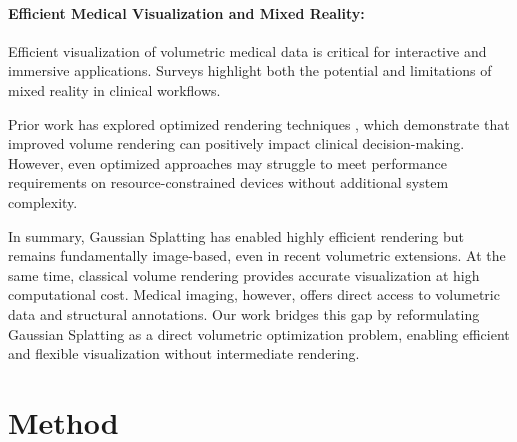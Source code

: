 \documentclass[runningheads]{llncs}
\begin{document}
\paragraph{Efficient Medical Visualization and Mixed Reality:}


Efficient visualization of volumetric medical data is critical for interactive and immersive applications. Surveys \cite{mrreview2024,mrreview2} highlight both the potential and limitations of mixed reality in clinical workflows.

Prior work has explored optimized rendering techniques \cite{avis2024}, which demonstrate that improved volume rendering can positively impact clinical decision-making. However, even optimized approaches may struggle to meet performance requirements on resource-constrained devices without additional system complexity.







In summary, Gaussian Splatting has enabled highly efficient rendering but remains fundamentally image-based, even in recent volumetric extensions. At the same time, classical volume rendering provides accurate visualization at high computational cost. Medical imaging, however, offers direct access to volumetric data and structural annotations. Our work bridges this gap by reformulating Gaussian Splatting as a direct volumetric optimization problem, enabling efficient and flexible visualization without intermediate rendering.




\section{Method}
\end{document}
